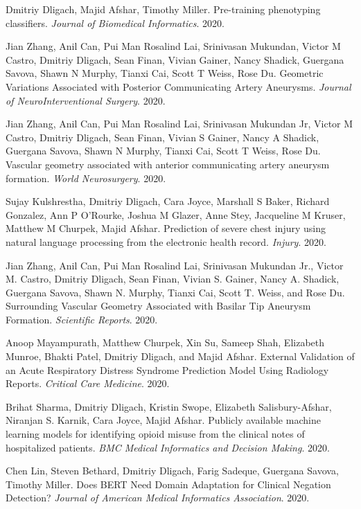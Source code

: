 \documentclass[letterpaper]{article}
\renewenvironment{itemize}{
  \begin{list}{}{
    \setlength{\leftmargin}{1.5em}
  }
}{
  \end{list}
}
\begin{document}
\begin{itemize}
\item Dmitriy Dligach, Majid Afshar, Timothy Miller. Pre-training phenotyping classifiers. \emph{Journal of Biomedical Informatics}. 2020.
\item Jian Zhang, Anil Can, Pui Man Rosalind Lai, Srinivasan Mukundan, Victor M Castro, Dmitriy Dligach, Sean Finan, Vivian Gainer, Nancy Shadick, Guergana Savova, Shawn N Murphy, Tianxi Cai, Scott T Weiss, Rose Du. Geometric Variations Associated with Posterior Communicating Artery Aneurysms. \emph{Journal of NeuroInterventional Surgery}. 2020.
\item Jian Zhang, Anil Can, Pui Man Rosalind Lai, Srinivasan Mukundan Jr, Victor M Castro, Dmitriy Dligach, Sean Finan, Vivian S Gainer, Nancy A Shadick, Guergana Savova, Shawn N Murphy, Tianxi Cai, Scott T Weiss, Rose Du. Vascular geometry associated with anterior communicating artery aneurysm formation. \emph{World Neurosurgery}. 2020.
\item Sujay Kulshrestha, Dmitriy Dligach, Cara Joyce, Marshall S Baker, Richard Gonzalez, Ann P O'Rourke, Joshua M Glazer, Anne Stey, Jacqueline M Kruser, Matthew M Churpek, Majid Afshar. Prediction of severe chest injury using natural language processing from the electronic health record. \emph{Injury}. 2020.
\item Jian Zhang, Anil Can, Pui Man Rosalind Lai, Srinivasan Mukundan Jr., Victor M. Castro, Dmitriy Dligach, Sean Finan, Vivian S. Gainer, Nancy A. Shadick, Guergana Savova, Shawn N. Murphy, Tianxi Cai, Scott T. Weiss, and Rose Du. Surrounding Vascular Geometry Associated with Basilar Tip Aneurysm Formation. \emph{Scientific Reports}. 2020.
\item Anoop Mayampurath, Matthew Churpek, Xin Su, Sameep Shah, Elizabeth Munroe, Bhakti Patel, Dmitriy Dligach, and Majid Afshar. External Validation of an Acute Respiratory Distress Syndrome Prediction Model Using Radiology Reports. \emph{Critical Care Medicine}. 2020.
\item Brihat Sharma, Dmitriy Dligach, Kristin Swope, Elizabeth Salisbury-Afshar, Niranjan S. Karnik, Cara Joyce, Majid Afshar. Publicly available machine learning models for identifying opioid misuse from the clinical notes of hospitalized patients. \emph{BMC Medical Informatics and Decision Making}. 2020.
\item Chen Lin, Steven Bethard, Dmitriy Dligach, Farig Sadeque, Guergana Savova, Timothy Miller. Does BERT Need Domain Adaptation for Clinical Negation Detection? \emph{Journal of American Medical Informatics Association}. 2020.

\end{itemize}
\end{document}
